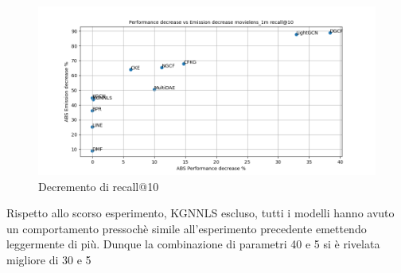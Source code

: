 \begin{figure}[H]
    \centering
    \includegraphics[scale=0.5]{images/decrement_recall@10_movielens_1m_30_5.png}
    \caption{Decremento di recall@10}
\end{figure}
\noindent Rispetto allo scorso esperimento, KGNNLS escluso, tutti i modelli hanno avuto un comportamento pressochè simile all'esperimento precedente emettendo leggermente di più. Dunque la combinazione di parametri 40 e 5 si è rivelata migliore di 30 e 5